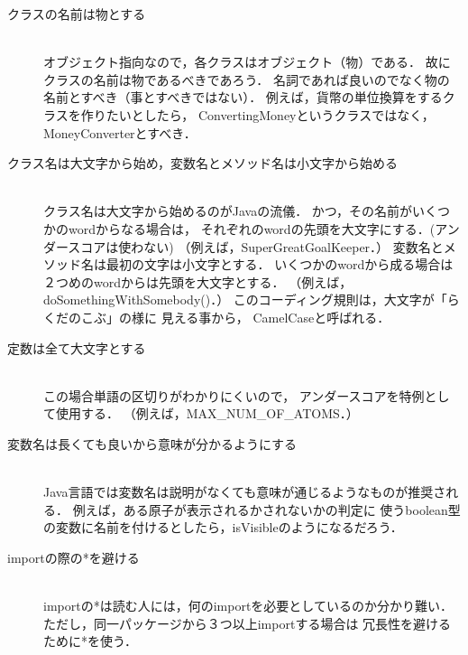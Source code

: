 \documentclass[a4j,openany]{jbook}
\begin{document}
\begin{description}
   \item[クラスの名前は物とする] \mbox{} \\
              オブジェクト指向なので，各クラスはオブジェクト（物）である．
              故にクラスの名前は物であるべきであろう．
              名詞であれば良いのでなく物の名前とすべき（事とすべきではない）．
              例えば，貨幣の単位換算をするクラスを作りたいとしたら，
              ConvertingMoneyというクラスではなく，MoneyConverterとすべき．
   \item[クラス名は大文字から始め，変数名とメソッド名は小文字から始める] \mbox{} \\
              クラス名は大文字から始めるのがJavaの流儀．
              かつ，その名前がいくつかのwordからなる場合は，
              それぞれのwordの先頭を大文字にする．(アンダースコアは使わない)
              （例えば，SuperGreatGoalKeeper．）
              変数名とメソッド名は最初の文字は小文字とする．
              いくつかのwordから成る場合は２つめのwordからは先頭を大文字とする．
              （例えば，doSomethingWithSomebody()．）
              このコーディング規則は，大文字が「らくだのこぶ」の様に
              見える事から， CamelCaseと呼ばれる．
   \item[定数は全て大文字とする] \mbox{} \\
              この場合単語の区切りがわかりにくいので，
              アンダースコアを特例として使用する．
              （例えば，MAX\_NUM\_OF\_ATOMS．）
   \item[変数名は長くても良いから意味が分かるようにする] \mbox{} \\
              Java言語では変数名は説明がなくても意味が通じるようなものが推奨される．
              例えば，ある原子が表示されるかされないかの判定に
              使うboolean型の変数に名前を付けるとしたら，isVisibleのようになるだろう．
   \item[importの際の*を避ける] \mbox{} \\
              importの*は読む人には，何のimportを必要としているのか分かり難い．
              ただし，同一パッケージから３つ以上importする場合は
              冗長性を避けるために*を使う．
  \end{description}
\end{document}
